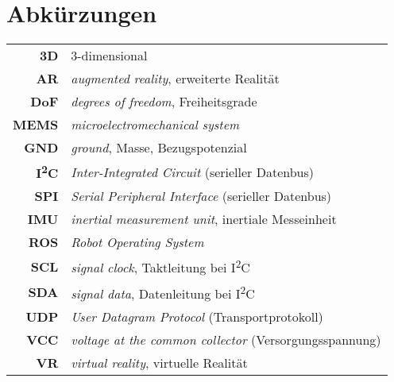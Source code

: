 \documentclass[11pt,DIV=15,BCOR=20mm,bibliography=totoc]{scrbook}
\newcommand{\fremdwort}[1]{\emph{#1}}
\newcommand{\iic}{I\textsuperscript{2}C\xspace}
\begin{document}


\frontmatter

\tableofcontents
\cleardoublepage
\chapter*{Abkürzungen}
\vspace{-1cm}
{
\begin{tabularx}{\textwidth}{@{}>{\bfseries}rX@{}}
    \toprule
    3D & 3-dimensional \\
    AR & \fremdwort{augmented reality}, erweiterte Realität \\
    DoF & \fremdwort{degrees of freedom}, Freiheitsgrade\\
    MEMS & \fremdwort{microelectromechanical system}\\
    GND & \fremdwort{ground}, Masse, Bezugspotenzial \\
    \iic & \fremdwort{Inter-Integrated Circuit} (serieller Datenbus)\\
    SPI & \fremdwort{Serial Peripheral Interface} (serieller Datenbus)\\
    IMU & \fremdwort{inertial measurement unit}, inertiale Messeinheit\\
    ROS & \fremdwort{Robot Operating System}\\
    SCL & \fremdwort{signal clock}, Taktleitung bei \iic \\
    SDA & \fremdwort{signal data}, Datenleitung bei \iic \\
    UDP & \fremdwort{User Datagram Protocol} (Transportprotokoll) \\
    VCC & \fremdwort{voltage at the common collector} (Versorgungsspannung) \\
    VR & \fremdwort{virtual reality}, virtuelle Realität\\
    \bottomrule
\end{tabularx}
}
\mainmatter








\cleardoublepage


\printbibliography[keyword=article]

\listoffigures

    
\end{document}
